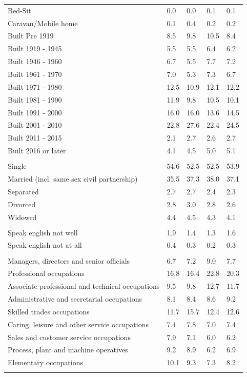 \documentclass{article}
\begin{document}
\begin{table}[h]
\begin{tabular}{KTTTT}
Bed-Sit & 0.0& 0.0& 0.1& 0.1\\
Caravan/Mobile home & 0.1& 0.4& 0.2& 0.2\\
    \hline
Built Pre 1919 &  8.5&  9.8& 10.5&  8.4\\
Built 1919 - 1945 & 5.5& 5.5& 6.4& 6.2\\
Built  1946 - 1960 & 6.7& 5.5& 7.7& 7.2\\
Built  1961 - 1970 & 7.0& 5.3& 7.3& 6.7\\
Built  1971 - 1980 & 12.5& 10.9& 12.1& 12.2\\
Built  1981 - 1990 & 11.9&  9.8& 10.5& 10.1\\
Built  1991 - 2000 & 16.0& 16.0& 13.6& 14.5\\
Built  2001 - 2010 & 22.8& 27.6& 22.4& 24.5\\
Built  2011 - 2015 & 2.1& 2.7& 2.6& 2.7\\
Built  2016 or later & 4.1& 4.5& 5.0& 5.1\\
\hline
    \\
    \hline
Single & 54.6& 52.5& 52.5& 53.9\\
Married (incl. same sex civil partnership) & 35.5& 37.3& 38.0& 37.1\\
Separated  & 2.7& 2.7& 2.4& 2.3\\
Divorced  & 2.8& 3.0& 2.8& 2.6\\
Widowed & 4.4& 4.5& 4.3& 4.1\\
\hline
    \\ 
    \hline
Speak english not well & 1.9& 1.4& 1.3& 1.6\\
Speak english not at all & 0.4& 0.3& 0.2& 0.3\\
\hline
    \\
    \hline
Managers, directors and senior officials & 6.7& 7.2& 9.0& 7.7\\
Professional occupations & 16.8& 16.4& 22.8& 20.3\\
Associate professional and technical occupations &  9.5&  9.8& 12.7& 11.7\\
Administrative and secretarial occupations & 8.1& 8.4& 8.6& 9.2\\
Skilled trades occupations & 11.7& 15.7& 12.4& 12.6\\
Caring, leisure and other service occupations & 7.4& 7.8& 7.0& 7.4\\
Sales and customer service occupations & 7.9& 7.1& 6.0& 6.2\\
Process, plant and machine operatives & 9.2& 8.9& 6.2& 6.9\\
Elementary occupations & 10.1&  9.3&  7.3&  8.2\\
\hline
\end{tabular}
\end{table}
\end{document}

